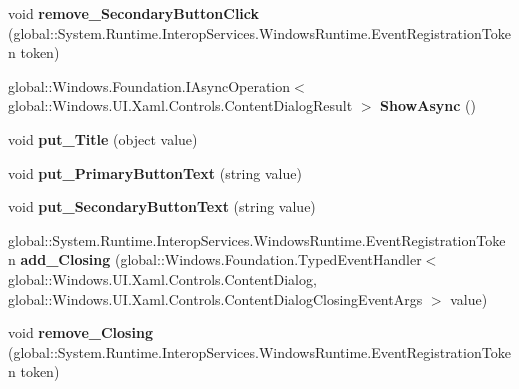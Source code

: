 \begin{DoxyCompactItemize}
void {\bfseries remove\+\_\+\+Secondary\+Button\+Click} (global\+::\+System.\+Runtime.\+Interop\+Services.\+Windows\+Runtime.\+Event\+Registration\+Token token)
\item 
\mbox{\label{interface_windows_1_1_u_i_1_1_xaml_1_1_controls_1_1_i_content_dialog_a7893cebe9c1247e5e3cf46b4438e662e}} 
global\+::\+Windows.\+Foundation.\+I\+Async\+Operation$<$ global\+::\+Windows.\+U\+I.\+Xaml.\+Controls.\+Content\+Dialog\+Result $>$ {\bfseries Show\+Async} ()
\item 
\mbox{\label{interface_windows_1_1_u_i_1_1_xaml_1_1_controls_1_1_i_content_dialog_afc276f713f3e2b87b2c5dee06ae15a45}} 
void {\bfseries put\+\_\+\+Title} (object value)
\item 
\mbox{\label{interface_windows_1_1_u_i_1_1_xaml_1_1_controls_1_1_i_content_dialog_ab7dd4baecced729d7b0c3c5dd82ccc5d}} 
void {\bfseries put\+\_\+\+Primary\+Button\+Text} (string value)
\item 
\mbox{\label{interface_windows_1_1_u_i_1_1_xaml_1_1_controls_1_1_i_content_dialog_af0c0753281acd52009a7c90aa0651582}} 
void {\bfseries put\+\_\+\+Secondary\+Button\+Text} (string value)
\item 
\mbox{\label{interface_windows_1_1_u_i_1_1_xaml_1_1_controls_1_1_i_content_dialog_a0c90eacfbf19a70c42e7827d75494527}} 
global\+::\+System.\+Runtime.\+Interop\+Services.\+Windows\+Runtime.\+Event\+Registration\+Token {\bfseries add\+\_\+\+Closing} (global\+::\+Windows.\+Foundation.\+Typed\+Event\+Handler$<$ global\+::\+Windows.\+U\+I.\+Xaml.\+Controls.\+Content\+Dialog, global\+::\+Windows.\+U\+I.\+Xaml.\+Controls.\+Content\+Dialog\+Closing\+Event\+Args $>$ value)
\item 
\mbox{\label{interface_windows_1_1_u_i_1_1_xaml_1_1_controls_1_1_i_content_dialog_a39db0b1822764cb6d5c7be9707a44c54}} 
void {\bfseries remove\+\_\+\+Closing} (global\+::\+System.\+Runtime.\+Interop\+Services.\+Windows\+Runtime.\+Event\+Registration\+Token token)

\end{DoxyCompactItemize}
